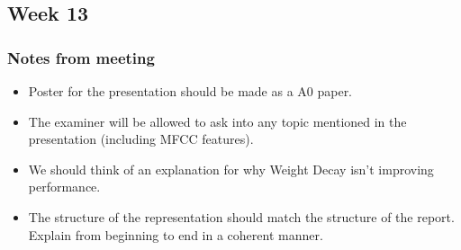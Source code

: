 
\subsection{Week 13}

\subsubsection{Notes from meeting}

\begin{itemize}
\item Poster for the presentation should be made as a A0 paper.
\item The examiner will be allowed to ask into any topic mentioned in the presentation (including MFCC features).
\item We should think of an explanation for why Weight Decay isn't improving performance.
\item The structure of the representation should match the structure of the report. Explain from beginning to end in a coherent manner.
\end{itemize}
